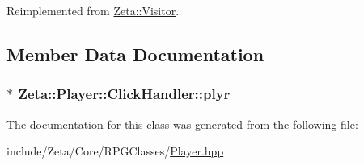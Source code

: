 Reimplemented from \hyperlink{classZeta_1_1Visitor_a4548e3dde9b14b28026c9d081dcb6b75}{Zeta\+::\+Visitor}.



\subsection{Member Data Documentation}
\hypertarget{classZeta_1_1Player_1_1ClickHandler_a638644f469abeffdba719060f509049c}{
\subsubsection[{plyr}]{$\ast$ Zeta\+::\+Player\+::\+Click\+Handler\+::plyr\hspace{0.3cm}{\ttfamily [private]}}}\label{classZeta_1_1Player_1_1ClickHandler_a638644f469abeffdba719060f509049c}


The documentation for this class was generated from the following file\+:\begin{DoxyCompactItemize}
\item 
include/\+Zeta/\+Core/\+R\+P\+G\+Classes/\hyperlink{Player_8hpp}{Player.\+hpp}\end{DoxyCompactItemize}
